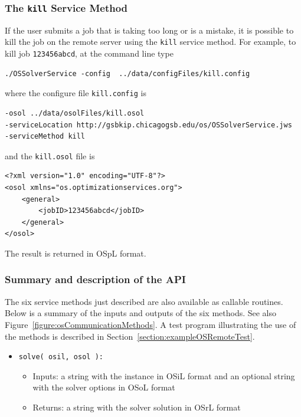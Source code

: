 \documentclass[11pt]{article}
\newcounter{Fig}
\renewcommand{\_}{{\char"5F}}
\renewcommand{\{}{{\char"7B}}
\renewcommand{\}}{{\char"7D}}
\renewcommand{\^}{{\char"0D}}
\renewcommand{\'}{{\char"0D}}
\begin{document}
\begin{enumerate}[Step 1:]
\subsubsection{The  {\tt kill}   Service Method}

If the user submits a job that is taking too long or is a mistake, it is possible to kill the job on the remote server using the {\tt kill} service method.
For example, to kill job {\tt 123456abcd}, at the command line type
\begin{verbatim}
./OSSolverService -config  ../data/configFiles/kill.config
\end{verbatim}
where the configure file {\tt kill.config} is
\begin{verbatim}
-osol ../data/osolFiles/kill.osol
-serviceLocation http://gsbkip.chicagogsb.edu/os/OSSolverService.jws
-serviceMethod kill
\end{verbatim}
and the {\tt kill.osol} file is
\begin{verbatim}
<?xml version="1.0" encoding="UTF-8"?>
<osol xmlns="os.optimizationservices.org">
    <general>
        <jobID>123456abcd</jobID>
    </general>
</osol>
\end{verbatim}

The result is returned in  OSpL format.



\subsubsection{Summary and description of the API}

The six service methods just described are also available as callable routines.
Below is a summary of the inputs and outputs of the six methods. See also Figure~\ref{figure:osCommunicationMethods}.
A test program illustrating the use of the methods is described in Section~\ref{section:exampleOSRemoteTest}.

\begin{itemize}

\item {\tt solve( osil, osol ):}

\begin{itemize}

\item Inputs: a string with the instance in OSiL format and an optional string with the solver options
in OSoL format

\item Returns: a string with the solver solution in OSrL format


\end{itemize}
\end{itemize}
\end{enumerate}
\end{document}
